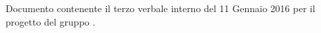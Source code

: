 Documento contenente il terzo verbale interno del 11 Gennaio 2016 per il progetto \progetto{} del gruppo \gruppo.